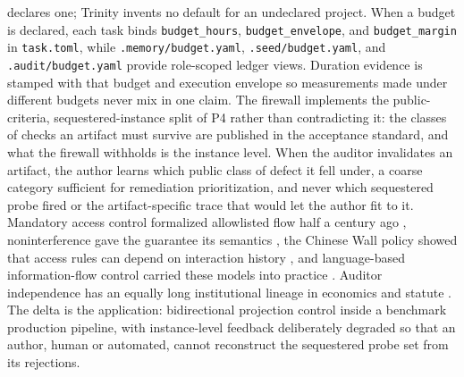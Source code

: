 \documentclass[11pt]{article}
\begin{document}
declares one; Trinity invents no default for an undeclared project. When a budget is declared, each task binds \texttt{budget\_hours}, \texttt{budget\_envelope}, and \texttt{budget\_margin} in \texttt{task.toml}, while \texttt{.memory/budget.yaml}, \texttt{.seed/budget.yaml}, and \texttt{.audit/budget.yaml} provide role-scoped ledger views. Duration evidence is stamped with that budget and execution envelope so measurements made under different budgets never mix in one claim. The firewall implements the public-criteria, sequestered-instance split of P4 rather than contradicting it: the classes of checks an artifact must survive are published in the acceptance standard, and what the firewall withholds is the instance level. When the auditor invalidates an artifact, the author learns which public class of defect it fell under, a coarse category sufficient for remediation prioritization, and never which sequestered probe fired or the artifact-specific trace that would let the author fit to it. Mandatory access control formalized allowlisted flow half a century ago \citep{bell1973secure, biba1977integrity}, noninterference gave the guarantee its semantics \citep{goguen1982security}, the Chinese Wall policy showed that access rules can depend on interaction history \citep{brewer1989chinese}, and language-based information-flow control carried these models into practice \citep{sabelfeld2003language}. Auditor independence has an equally long institutional lineage in economics and statute \citep{deangelo1981auditor, sox2002}. The delta is the application: bidirectional projection control inside a benchmark production pipeline, with instance-level feedback deliberately degraded so that an author, human or automated, cannot reconstruct the sequestered probe set from its rejections.
\end{document}

